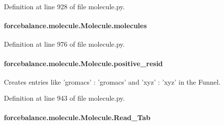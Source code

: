 Definition at line 928 of file molecule.\-py.

\hypertarget{classforcebalance_1_1molecule_1_1Molecule_a2537929702245aab6ab293c145730d7c}{
\paragraph[{molecules}]{\setlength{\rightskip}{0pt plus 5cm}forcebalance.\-molecule.\-Molecule.\-molecules}}\label{classforcebalance_1_1molecule_1_1Molecule_a2537929702245aab6ab293c145730d7c}


Definition at line 976 of file molecule.\-py.

\hypertarget{classforcebalance_1_1molecule_1_1Molecule_af9d8dc89fee54b2b89558633f2c9b70a}{
\paragraph[{positive\-\_\-resid}]{\setlength{\rightskip}{0pt plus 5cm}forcebalance.\-molecule.\-Molecule.\-positive\-\_\-resid}}\label{classforcebalance_1_1molecule_1_1Molecule_af9d8dc89fee54b2b89558633f2c9b70a}


Creates entries like 'gromacs' \-: 'gromacs' and 'xyz' \-: 'xyz' in the Funnel. 



Definition at line 943 of file molecule.\-py.

\hypertarget{classforcebalance_1_1molecule_1_1Molecule_a35600d98f150597c9d9ac5129e01bd8d}{
\paragraph[{Read\-\_\-\-Tab}]{\setlength{\rightskip}{0pt plus 5cm}forcebalance.\-molecule.\-Molecule.\-Read\-\_\-\-Tab}}\label{classforcebalance_1_1molecule_1_1Molecule_a35600d98f150597c9d9ac5129e01bd8d}


